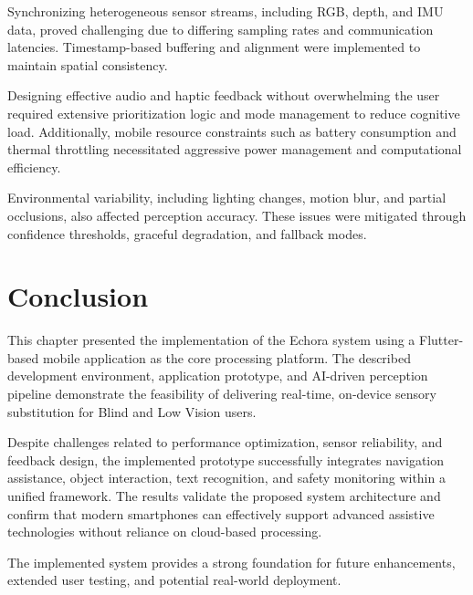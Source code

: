Synchronizing heterogeneous sensor streams, including RGB, depth, and IMU data, proved challenging due to differing sampling rates and communication latencies. Timestamp-based buffering and alignment were implemented to maintain spatial consistency.

Designing effective audio and haptic feedback without overwhelming the user required extensive prioritization logic and mode management to reduce cognitive load. Additionally, mobile resource constraints such as battery consumption and thermal throttling necessitated aggressive power management and computational efficiency.

Environmental variability, including lighting changes, motion blur, and partial occlusions, also affected perception accuracy. These issues were mitigated through confidence thresholds, graceful degradation, and fallback modes.


\section{Conclusion}

This chapter presented the implementation of the Echora system using a Flutter-based mobile application as the core processing platform. The described development environment, application prototype, and AI-driven perception pipeline demonstrate the feasibility of delivering real-time, on-device sensory substitution for Blind and Low Vision users.

Despite challenges related to performance optimization, sensor reliability, and feedback design, the implemented prototype successfully integrates navigation assistance, object interaction, text recognition, and safety monitoring within a unified framework. The results validate the proposed system architecture and confirm that modern smartphones can effectively support advanced assistive technologies without reliance on cloud-based processing.

The implemented system provides a strong foundation for future enhancements, extended user testing, and potential real-world deployment.
